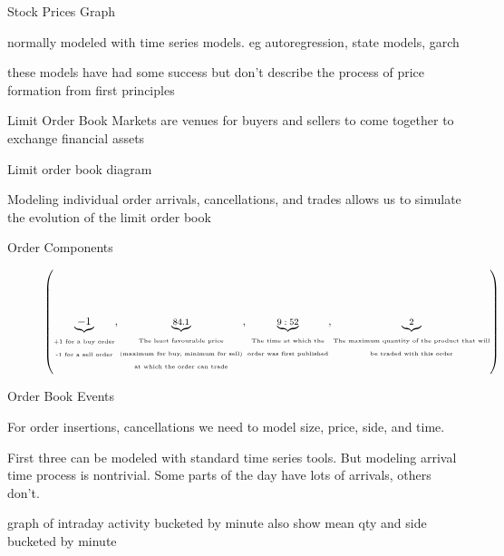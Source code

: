 \documentclass[usenames,dvipsnames,handout]{beamer}
\begin{document}
\frame{\titlepage}

\begin{frame}{Stock Prices}
	Graph

	normally modeled with time series models. eg autoregression, state models, garch

	these models have had some success but don't describe the process of price formation from first principles
\end{frame}

\begin{frame}{Limit Order Book}
	Markets are venues for buyers and sellers to come together to exchange financial assets

	Limit order book diagram

	Modeling individual order arrivals, cancellations, and trades allows us to simulate the evolution of the limit order book
\end{frame}

\begin{frame}{Order Components}
	\begin{figure}[h]
		$$\left(\underbrace{-1}_{\fontsize{5}{8}\begin{matrix} \text{+1 for a buy order}\\ \text{-1 for a sell order}\end{matrix}}\fontsize{8}{8},\underbrace{84.1}_{\fontsize{5}{8}\begin{matrix}\text{The least favourable price}\\\text{(maximum for buy, minimum for sell)}\\\text{at which the order can trade}\end{matrix}}\fontsize{8}{8},\underbrace{9:52}_{\fontsize{5}{8}\begin{matrix}\text{The time at which the}\\\text{order was first published}\end{matrix}}\fontsize{8}{8},\underbrace{2}_{\fontsize{5}{8}\begin{matrix}\text{The maximum quantity of the product that will}\\\text{be traded with this order}\end{matrix}}\right)$$
	\end{figure}
\end{frame}

\begin{frame}{Order Book Events}

	For order insertions, cancellations we need to model size, price, side, and time.

	First three can be modeled with standard time series tools. But modeling arrival time process is nontrivial. Some parts of the day have lots of arrivals, others don't.

	graph of intraday activity bucketed by minute
	also show mean qty and side bucketed by minute
\end{frame}
\end{document}
